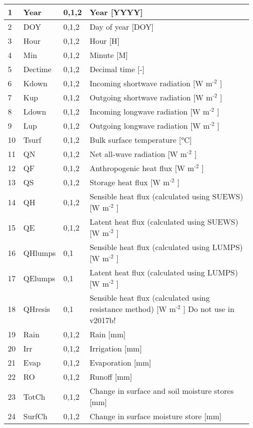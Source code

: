 \documentclass[letterpaper,10pt,english]{sphinxmanual}
\begin{document}
\begin{savenotes}
\begin{longtable}{|l|l|l|l|}
1
&
Year
&
0,1,2
&
Year {[}YYYY{]}
\\
\hline
2
&
DOY
&
0,1,2
&
Day of year {[}DOY{]}
\\
\hline
3
&
Hour
&
0,1,2
&
Hour {[}H{]}
\\
\hline
4
&
Min
&
0,1,2
&
Minute {[}M{]}
\\
\hline
5
&
Dectime
&
0,1,2
&
Decimal time {[}-{]}
\\
\hline
6
&
Kdown
&
0,1,2
&
Incoming shortwave radiation {[}W m$^{\text{-2}}$ {]}
\\
\hline
7
&
Kup
&
0,1,2
&
Outgoing shortwave radiation {[}W m$^{\text{-2}}$ {]}
\\
\hline
8
&
Ldown
&
0,1,2
&
Incoming longwave radiation {[}W m$^{\text{-2}}$ {]}
\\
\hline
9
&
Lup
&
0,1,2
&
Outgoing longwave radiation {[}W m$^{\text{-2}}$ {]}
\\
\hline
10
&
Tsurf
&
0,1,2
&
Bulk surface temperature {[}°C{]}
\\
\hline
11
&
QN
&
0,1,2
&
Net all-wave radiation {[}W m$^{\text{-2}}$ {]}
\\
\hline
12
&
QF
&
0,1,2
&
Anthropogenic heat flux {[}W m$^{\text{-2}}$ {]}
\\
\hline
13
&
QS
&
0,1,2
&
Storage heat flux {[}W m$^{\text{-2}}$ {]}
\\
\hline
14
&
QH
&
0,1,2
&
Sensible heat flux (calculated using SUEWS) {[}W m$^{\text{-2}}$ {]}
\\
\hline
15
&
QE
&
0,1,2
&
Latent heat flux (calculated using SUEWS) {[}W m$^{\text{-2}}$ {]}
\\
\hline
16
&
QHlumps
&
0,1
&
Sensible heat flux (calculated using LUMPS) {[}W m$^{\text{-2}}$ {]}
\\
\hline
17
&
QElumps
&
0,1
&
Latent heat flux (calculated using LUMPS) {[}W m$^{\text{-2}}$ {]}
\\
\hline
18
&
QHresis
&
0,1
&
Sensible heat flux (calculated using resistance method) {[}W m$^{\text{-2}}$ {]} Do not use in v2017b!
\\
\hline
19
&
Rain
&
0,1,2
&
Rain {[}mm{]}
\\
\hline
20
&
Irr
&
0,1,2
&
Irrigation {[}mm{]}
\\
\hline
21
&
Evap
&
0,1,2
&
Evaporation {[}mm{]}
\\
\hline
22
&
RO
&
0,1,2
&
Runoff {[}mm{]}
\\
\hline
23
&
TotCh
&
0,1,2
&
Change in surface and soil moisture stores {[}mm{]}
\\
\hline
24
&
SurfCh
&
0,1,2
&
Change in surface moisture store {[}mm{]}

\end{longtable}
\end{savenotes}
\end{document}
